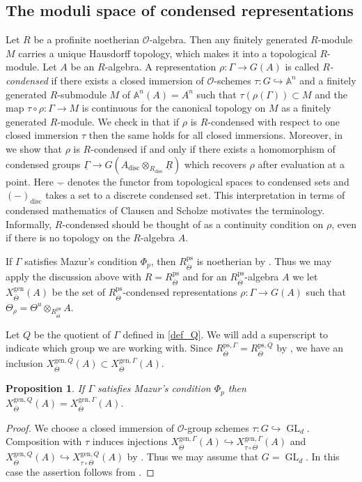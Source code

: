 \documentclass{amsart}
\newtheorem{prop}{Proposition}[section]
\theoremstyle{definition}
\theoremstyle{remark}
\DeclareMathOperator{\GL}{GL}
\newcommand{\OO}{\mathcal O}
\newcommand{\gen}{\mathrm{gen}}
\newcommand{\disc}{\operatorname{disc}}
\newcommand{\Thetabar}{\overline{\Theta}}
\newcommand{\ps}{\mathrm{ps}}
\begin{document}
\subsection{The moduli space  of condensed representations}
Let $R$ be a profinite noetherian $\OO$-algebra. Then any finitely generated 
$R$-module $M$ carries a unique Hausdorff topology, which makes it into a topological 
$R$-module. Let $A$ be an $R$-algebra. A representation $\rho: \Gamma\rightarrow G(A)$
is called \textit{$R$-condensed} if there exists a closed immersion of $\OO$-schemes
$\tau: G\hookrightarrow \mathbb A^n$ and a finitely generated $R$-submodule $M$ of 
$\mathbb{A}^n(A)=A^n$ such that $\tau(\rho(\Gamma))\subset M$ and 
the map $\tau\circ \rho: \Gamma \rightarrow M$ is continuous for the canonical topology on $M$ as a finitely generated $R$-module. We check in 
\cite[Lemma 4.2]{defG} that if $\rho$ is $R$-condensed with respect to 
one closed immersion $\tau$ then the same holds for all closed immersions.
Moreover, in \cite[Section 4.2]{defG} we show that $\rho$ is $R$-condensed 
if and only if there exists a homomorphism of condensed groups $\underline{\Gamma} \to G(A_{\disc} \otimes_{R_{\disc}} \underline{R})$ which recovers $\rho$ after evaluation at a point.
Here $\underline{-}$ denotes the functor from topological spaces to condensed sets and $(-)_{\disc}$ takes a set to a discrete condensed set. This interpretation in terms 
of condensed mathematics of Clausen and Scholze \cite{ScholzeCond} motivates the terminology. Informally,
$R$-condensed should be thought of as a continuity condition on $\rho$, even if 
there is no topology on the $R$-algebra $A$. 

If $\Gamma$ satisfies Mazur's condition $\Phi_p$, then $R^{\ps}_{\Thetabar}$ is 
noetherian by .
Thus we may apply the discussion above with $R=R^{\ps}_{\Thetabar}$ and for an $R^{\ps}_{\Thetabar}$-algebra $A$ we let $X^{\gen}_{\Thetabar}(A)$ be the set of $R^{\ps}_{\Thetabar}$-condensed representations $\rho: \Gamma \rightarrow G(A)$ such that $\Theta_{\rho}=\Theta^u\otimes_{R^{\ps}_{\Thetabar}} A$. 

Let $Q$ be the quotient of $\Gamma$ defined in \eqref{def_Q}. We will add 
a superscript to indicate  which group we are working with. Since $R^{\ps, 
\Gamma}_{\Thetabar}= R^{\ps, Q}_{\Thetabar}$ by , we have 
an inclusion $X^{\gen, Q}_{\Thetabar}(A)\subset X^{\gen, \Gamma}_{\Thetabar}(A)$.

\begin{prop}\label{XgenQ} If $\Gamma$ satisfies Mazur's condition $\Phi_p$ then 
$X^{\gen, Q}_{\Thetabar}(A)=X^{\gen, \Gamma}_{\Thetabar}(A)$.
\end{prop}
\begin{proof} We choose a closed immersion of $\OO$-group schemes
$\tau: G \hookrightarrow \GL_d$. Composition with $\tau$ induces 
injections $X^{\gen, \Gamma}_{\Thetabar}(A) \hookrightarrow X^{\gen, \Gamma}_{\tau\circ \Thetabar}(A)$ and $X^{\gen, Q}_{\Thetabar}(A) \hookrightarrow X^{\gen, Q}_{\tau\circ \Thetabar}(A)$ by \cite[Proposition 3.8]{defG}. Thus we may assume that $G=\GL_d$. 
In this case the assertion follows from \cite[Lemma 5.5]{defG}.
\end{proof} 
\end{document}
